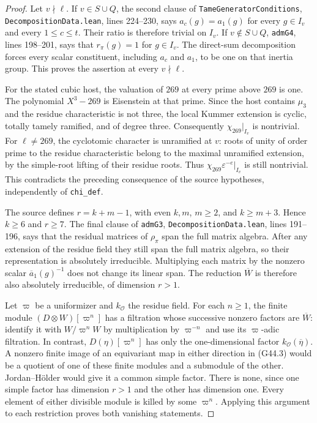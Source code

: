 \begin{proof}
Let $v\nmid\ell$.  If $v\in S\cup Q$, the second clause of
\texttt{TameGeneratorConditions},
\texttt{DecompositionData.lean}, lines 224--230, says
$a_c(g)=a_1(g)$ for every $g\in I_v$ and every $1\le c\le t$.
Their ratio is therefore trivial on $I_v$.
If $v\notin S\cup Q$, \texttt{admG4}, lines 198--201,
says that $r_\pi(g)=1$ for $g\in I_v$.
The direct-sum decomposition forces every scalar constituent,
including $a_c$ and $a_1$, to be one on that inertia group.
This proves the assertion at every $v\nmid\ell$.

For the stated cubic host, the valuation of $269$ at every prime
above $269$ is one.  The polynomial $X^3-269$ is Eisenstein at
that prime.  Since the host contains $\mu_3$ and the residue
characteristic is not three, the local Kummer extension is
cyclic, totally tamely ramified, and of degree three.
Consequently $\chi_{269}|_{I_v}$ is nontrivial.
For $\ell\ne269$, the cyclotomic character is unramified at $v$:
roots of unity of order prime to the residue characteristic
belong to the maximal unramified extension, by the simple-root
lifting of their residue roots.  Thus
$\chi_{269}\varepsilon^{-e}|_{I_v}$ is still nontrivial.
This contradicts the preceding consequence of the source
hypotheses, independently of \texttt{chi\_def}.

The source 
defines $r=k+m-1$, with even $k,m$, $m\ge2$, and
$k\ge m+3$.  Hence $k\ge6$ and $r\ge7$.
The final clause of \texttt{admG3},
\texttt{DecompositionData.lean}, lines 191--196, says that
the residual matrices of $\rho_\pi$ span the full matrix
algebra.  After any extension of the residue field they still
span the full matrix algebra, so their representation is
absolutely irreducible.  Multiplying each matrix by the
nonzero scalar $\overline a_1(g)^{-1}$ does not change its
linear span.  The reduction $\overline W$ is therefore also
absolutely irreducible, of dimension $r>1$.

Let $\varpi$ be a uniformizer and $k_{\mathcal O}$ the residue
field.  For each $n\ge1$, the finite module
$(D\otimes W)[\varpi^n]$ has a filtration whose successive
nonzero factors are $\overline W$: identify it with
$W/\varpi^n W$ by multiplication by $\varpi^{-n}$ and use
its $\varpi$-adic filtration.  In contrast,
$D(\eta)[\varpi^n]$ has only the one-dimensional factor
$k_{\mathcal O}(\overline\eta)$.
A nonzero finite image of an equivariant map in either
direction in (G44.3) would be a quotient of one of these
finite modules and a submodule of the other.  Jordan--H\"older
would give it a common simple factor.  There is none, since
one simple factor has dimension $r>1$ and the other has
dimension one.  Every element of either divisible module
is killed by some $\varpi^n$.  Applying this argument to
each restriction proves both vanishing statements.
\end{proof}

